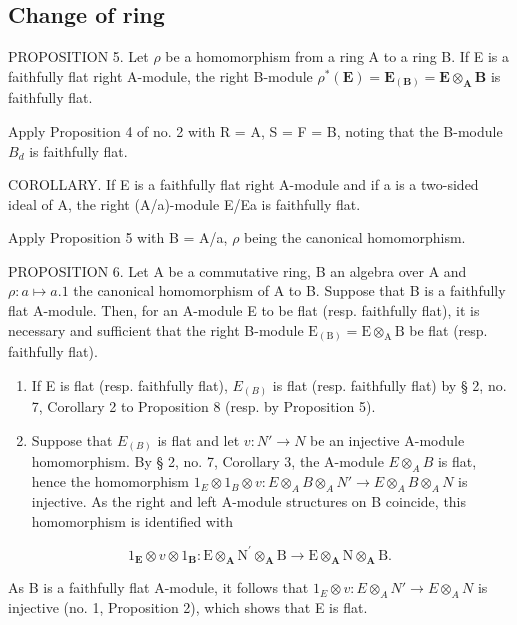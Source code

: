 \subsection{Change of ring}

PROPOSITION 5. Let \(\rho\) be a homomorphism from a ring A to a ring B. If E is a faithfully flat right A-module, the right B-module \(\rho^{*}(\mathbf{E}) = \mathbf{E}_{(\mathbf{B})} = \mathbf{E} \otimes_{\mathbf{A}} \mathbf{B}\) is faithfully flat.

Apply Proposition 4 of no. 2 with R = A, S = F = B, noting that the B-module \(B_{d}\) is faithfully flat.

COROLLARY. If E is a faithfully flat right A-module and if a is a two-sided ideal of A, the right (A/a)-module E/Ea is faithfully flat.

Apply Proposition 5 with B = A/a, \(\rho\) being the canonical homomorphism.

PROPOSITION 6. Let A be a commutative ring, B an algebra over A and \(\rho: a \mapsto a . 1\) the canonical homomorphism of A to B. Suppose that B is a faithfully flat A-module. Then, for an A-module E to be flat (resp. faithfully flat), it is necessary and sufficient that the right B-module \(\mathrm{E}_{(\mathrm{B})} = \mathrm{E} \otimes_{\mathrm{A}} \mathrm{B}\) be flat (resp. faithfully flat).

\begin{enumerate}
\def\labelenumi{(\arabic{enumi})}
\item
  If E is flat (resp. faithfully flat), \(E_{(B)}\) is flat (resp. faithfully flat) by § 2, no. 7, Corollary 2 to Proposition 8 (resp. by Proposition 5).
\item
  Suppose that \(E_{(B)}\) is flat and let \(v: N' \to N\) be an injective A-module homomorphism. By § 2, no. 7, Corollary 3, the A-module \(E \otimes_{A} B\) is flat, hence the homomorphism \(1_{E} \otimes 1_{B} \otimes v: E \otimes_{A} B \otimes_{A} N' \to E \otimes_{A} B \otimes_{A} N\) is injective. As the right and left A-module structures on B coincide, this homomorphism is identified with
\end{enumerate}

\[
\mathrm{1} _ {\mathbf {E}} \otimes v \otimes \mathrm{1} _ {\mathbf {B}}: \mathrm{E} \otimes_ {\mathbf {A}} \mathrm{N} ^ {\prime} \otimes_ {\mathbf {A}} \mathrm{B} \rightarrow \mathrm{E} \otimes_ {\mathbf {A}} \mathrm{N} \otimes_ {\mathbf {A}} \mathrm{B}.
\]

As B is a faithfully flat A-module, it follows that \(1_{E} \otimes v: E \otimes_{A} N' \to E \otimes_{A} N\) is injective (no. 1, Proposition 2), which shows that E is flat.

